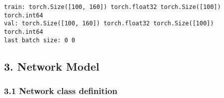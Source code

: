 \documentclass[10pt]{article}
\begin{document}
    \begin{Verbatim}[commandchars=\\\{\}]
train: torch.Size([100, 160]) torch.float32 torch.Size([100]) torch.int64
val: torch.Size([100, 160]) torch.float32 torch.Size([100]) torch.int64
last batch size: 0 0
    \end{Verbatim}

    \hypertarget{network-model}{%
\subsection{3. Network Model}\label{network-model}}

    \hypertarget{network-class-definition}{%
\subsubsection{3.1 Network class
definition}\label{network-class-definition}}
\end{document}
